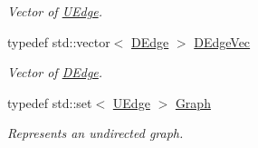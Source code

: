 \begin{CompactItemize}
\begin{CompactList}\small\item\em Vector of \hyperlink{classdai_1_1UEdge}{UEdge}. \item\end{CompactList}\item 
\hypertarget{namespacedai_e7764251ab4d4b2d4fbec214eac83079}{
typedef std::vector$<$ \hyperlink{classdai_1_1DEdge}{DEdge} $>$ \hyperlink{namespacedai_e7764251ab4d4b2d4fbec214eac83079}{DEdgeVec}}
\label{namespacedai_e7764251ab4d4b2d4fbec214eac83079}

\begin{CompactList}\small\item\em Vector of \hyperlink{classdai_1_1DEdge}{DEdge}. \item\end{CompactList}\item 
\hypertarget{namespacedai_dfcfd53771d59db79ddd826928e76400}{
typedef std::set$<$ \hyperlink{classdai_1_1UEdge}{UEdge} $>$ \hyperlink{namespacedai_dfcfd53771d59db79ddd826928e76400}{Graph}}
\label{namespacedai_dfcfd53771d59db79ddd826928e76400}

\begin{CompactList}\small\item\em Represents an undirected graph. \item\end{CompactList}\end{CompactItemize}
